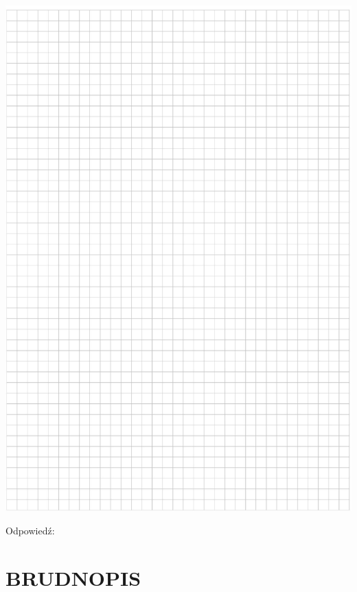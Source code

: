 \documentclass[10pt]{article}
\begin{document}
\begin{center}
\includegraphics[max width=\textwidth]{2024_11_21_6a8be49478f78d0689cfg-19}
\end{center}

Odpowiedź:

\section*{BRUDNOPIS}
\end{document}
